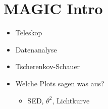 \section{MAGIC Intro}%
\label{sec:magic}

\begin{itemize}
  \item Teleskop
  \item Datenanalyse
\end{itemize}

\begin{itemize}
  \item Tscherenkov-Schauer
  \item Welche Plots sagen was aus?
    \begin{itemize}
      \item SED, $\theta^2$, Lichtkurve
    \end{itemize}
\end{itemize}
